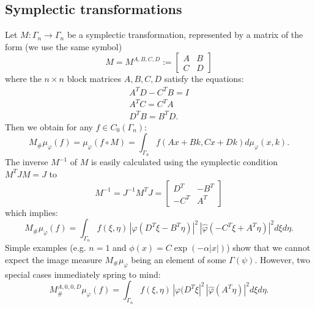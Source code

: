 \documentclass[12pt,a4paper,draft]{article}
\begin{document}
\subsection{Symplectic transformations}
Let $M:\Gamma_n \rightarrow \Gamma_n$ be a symplectic transformation, represented
by a matrix of the form (we use the same symbol)
\begin{displaymath}
          M=M^{A,B,C,D}:=\begin{bmatrix}
          A & B \\ 
          C & D
          \end{bmatrix} 
\end{displaymath}
where the $n\times n$ block matrices $A,B,C,D$ satisfy the equations:
\begin{displaymath}
         \begin{array}{c}
          A^T D - C^T B = I \\
          A^T C = C^T A \\ 
          D^T B = B^T D. 
         \end{array} 
\end{displaymath}
Then we obtain for any $f\in C_0({\Gamma_n})$:
\begin{displaymath}
      M_{\#}\mu_{\varphi}(f) = \mu_{\varphi}(f\circ M) = 
         \int_{\Gamma_n} f(A x+B k, C x + D k) d\mu_{\varphi}(x,k).
\end{displaymath}
The inverse $M^{-1}$ of $M$ is easily calculated using the symplectic
condition $M^T J M = J$ to
\begin{displaymath}
           M^{-1}=J^{-1} M^T J = \begin{bmatrix}
          D^T & -B^T \\ 
          -C^T & A^T
          \end{bmatrix}
\end{displaymath}
which implies:
\begin{displaymath}
      M_{\#}\mu_{\varphi}(f) =  \int_{\Gamma_n} f(\xi,\eta)\,
      |\varphi(D^T \xi - B^T \eta)|^2 \,
      |\hat\varphi(-C^T \xi + A^T \eta)|^2 d\xi d\eta.       
\end{displaymath}
Simple examples (e.g. $n=1$ and $\phi(x)=C \exp(-\alpha |x|)$) show that 
we cannot expect the image measure $M_{\#}\mu_{\varphi}$ being an element of some
$\Gamma(\psi)$. However, two special cases immediately spring to mind:
\begin{displaymath}
          M^{A,0,0,D}_{\#}\mu_{\varphi}(f) =  \int_{\Gamma_n} f(\xi,\eta)\,
      |\varphi(D^T \xi|^2 \,
      |\hat\varphi(A^T \eta)|^2 d\xi d\eta. 
\end{displaymath}
\end{document}
